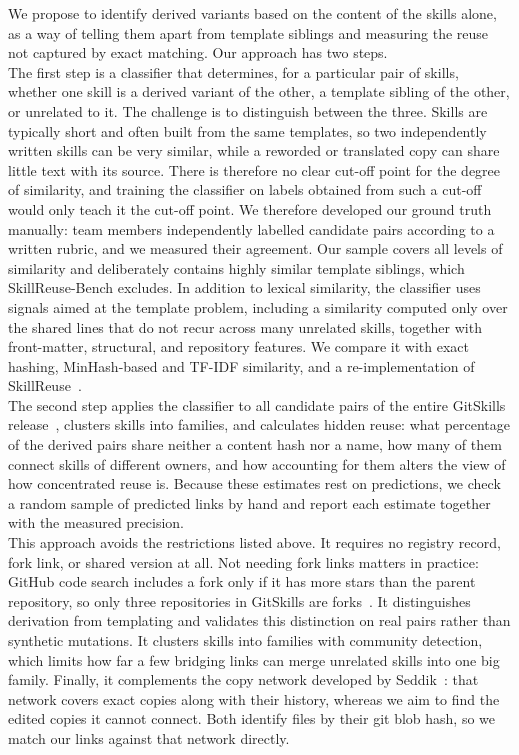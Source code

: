 \documentclass[sigconf,screen]{acmart}
\begin{document}
We propose to identify derived variants based on the content of the skills alone, as a way of telling them apart from template siblings and measuring the reuse not captured by exact matching. Our approach has two steps. \\
The first step is a classifier that determines, for a particular pair of skills, whether one skill is a derived variant of the other, a template sibling of the other, or unrelated to it. The challenge is to distinguish between the three. Skills are typically short and often built from the same templates, so two independently written skills can be very similar, while a reworded or translated copy can share little text with its source. There is therefore no clear cut-off point for the degree of similarity, and training the classifier on labels obtained from such a cut-off would only teach it the cut-off point. We therefore developed our ground truth manually: team members independently labelled candidate pairs according to a written rubric, and we measured their agreement. Our sample covers all levels of similarity and deliberately contains highly similar template siblings, which SkillReuse-Bench excludes. In addition to lexical similarity, the classifier uses signals aimed at the template problem, including a similarity computed only over the shared lines that do not recur across many unrelated skills, together with front-matter, structural, and repository features. We compare it with exact hashing, MinHash-based and TF-IDF similarity, and a re-implementation of SkillReuse~\cite{zhu2026skillreuse}. \\
The second step applies the classifier to all candidate pairs of the entire GitSkills release~\cite{gitskills_release}, clusters skills into families, and calculates hidden reuse: what percentage of the derived pairs share neither a content hash nor a name, how many of them connect skills of different owners, and how accounting for them alters the view of how concentrated reuse is. Because these estimates rest on predictions, we check a random sample of predicted links by hand and report each estimate together with the measured precision. \\
This approach avoids the restrictions listed above. It requires no registry record, fork link, or shared version at all. Not needing fork links matters in practice: GitHub code search includes a fork only if it has more stars than the parent repository, so only three repositories in GitSkills are forks~\cite{gitskills_sample}. It distinguishes derivation from templating and validates this distinction on real pairs rather than synthetic mutations. It clusters skills into families with community detection, which limits how far a few bridging links can merge unrelated skills into one big family. Finally, it complements the copy network developed by Seddik~\cite{seddik2026constellations}: that network covers exact copies along with their history, whereas we aim to find the edited copies it cannot connect. Both identify files by their git blob hash, so we match our links against that network directly. \\
\end{document}

